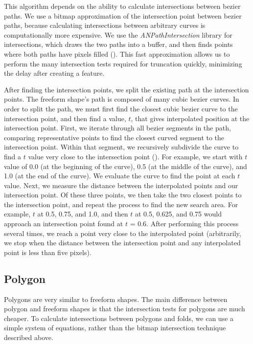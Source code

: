 This algorithm depends on the ability to calculate intersections between
bezier paths. We use a bitmap approximation of the intersection point
between bezier paths, because calculating intersections between
arbitrary curves is computationally more expensive. We use the
\emph{ANPathIntersection} library for intersections, which draws the two
paths into a buffer, and then finds points where both paths have pixels
filled (\citet{ANPathIntersection}). This fast approximation allows us
to perform the many intersection tests required for truncation quickly,
minimizing the delay after creating a feature.

After finding the intersection points, we split the existing path at the
intersection points. The freeform shape's path is composed of many cubic
bezier curves. In order to split the path, we must first find the
closest cubic bezier curve to the intersection point, and then find a
value, \(t\), that gives interpolated position at the intersection
point. First, we iterate through all bezier segments in the path,
comparing representative points to find the closest curved segment to
the intersection point. Within that segment, we recursively subdivide
the curve to find a \(t\) value very close to the intersection point
(\citet{phillips1997casteljau}). For example, we start with \(t\) value
of 0.0 (at the beginning of the curve), 0.5 (at the middle of the
curve), and 1.0 (at the end of the curve). We evaluate the curve to find
the point at each \(t\) value. Next, we measure the distance between the
interpolated points and our intersection point. Of these three points,
we then take the two closest points to the intersection point, and
repeat the process to find the new search area. For example, \(t\) at
0.5, 0.75, and 1.0, and then \(t\) at 0.5, 0.625, and 0.75 would
approach an intersection point found at \(t\) = 0.6. After performing
this process several times, we reach a point very close to the
interpolated point (arbitrarily, we stop when the distance between the
intersection point and any interpolated point is less than five pixels).

\subsection{Polygon}\label{polygon}

Polygons are very similar to freeform shapes. The main difference
between polygon and freeform shapes is that the intersection tests for
polygons are much cheaper. To calculate intersections between polygons
and folds, we can use a simple system of equations, rather than the
bitmap intersection technique described above.

